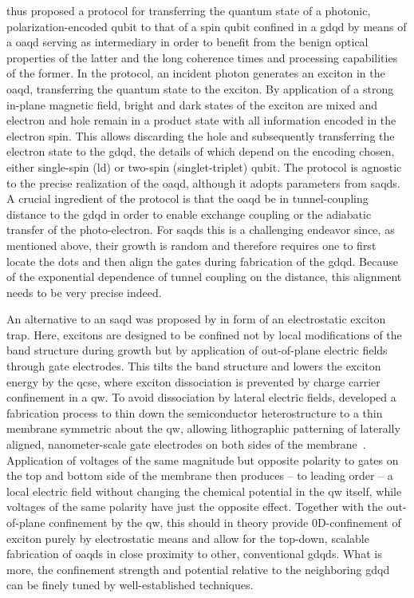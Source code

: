 \citet{Jocker2019} thus proposed a protocol for transferring the quantum state of a photonic, polarization-encoded qubit to that of a spin qubit confined in a \gls{gdqd} by means of a \gls{oaqd} serving as intermediary in order to benefit from the benign optical properties of the latter and the long coherence times and processing capabilities of the former.
In the protocol, an incident photon generates an exciton in the \gls{oaqd}, transferring the quantum state to the exciton.
By application of a strong in-plane magnetic field, bright and dark states of the exciton are mixed and electron and hole remain in a product state with all information encoded in the electron spin.
This allows discarding the hole and subsequently transferring the electron state to the \gls{gdqd}, the details of which depend on the encoding chosen, either single-spin (\gls{ld}) or two-spin (singlet-triplet) qubit.
The protocol is agnostic to the precise realization of the \gls{oaqd}, although it adopts parameters from \glspl{saqd}.
A crucial ingredient of the protocol is that the \gls{oaqd} be in tunnel-coupling distance to the \gls{gdqd} in order to enable exchange coupling or the adiabatic transfer of the photo-electron.
For \glspl{saqd} this is a challenging endeavor since, as mentioned above, their growth is random and therefore requires one to first locate the dots and then align the gates during fabrication of the \gls{gdqd}.
Because of the exponential dependence of tunnel coupling on the distance, this alignment needs to be very precise indeed.

An alternative to an \gls{saqd} was proposed by \citet{Descamps2021} in form of an electrostatic exciton trap.
Here, excitons are designed to be confined not by local modifications of the band structure during growth but by application of out-of-plane electric fields through gate electrodes.
This tilts the band structure and lowers the exciton energy by the \gls{qcse}, where exciton dissociation is prevented by charge carrier confinement in a \gls{qw}.
To avoid dissociation by lateral electric fields, \citet{Descamps2021} developed a fabrication process to thin down the semiconductor heterostructure to a thin membrane symmetric about the \gls{qw}, allowing lithographic patterning of laterally aligned, nanometer-scale gate electrodes on both sides of the membrane~\cite{Descamps2023}.
Application of voltages of the same magnitude but opposite polarity to gates on the top and bottom side of the membrane then produces -- to leading order -- a local electric field without changing the chemical potential in the \gls{qw} itself, while voltages of the same polarity have just the opposite effect.
Together with the out-of-plane confinement by the \gls{qw}, this should in theory provide 0D-confinement of exciton purely by electrostatic means and allow for the top-down, scalable fabrication of \glspl{oaqd} in close proximity to other, conventional \glspl{gdqd}.
What is more, the confinement strength and potential relative to the neighboring \gls{gdqd} can be finely tuned by well-established techniques.

